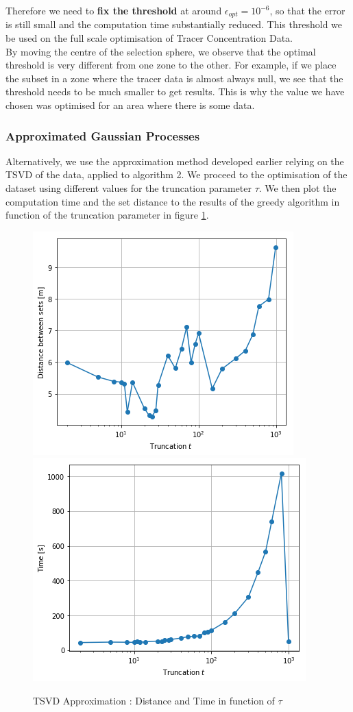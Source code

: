 Therefore we need to \textbf{fix the threshold} at around $ \epsilon_{opt} = 10^{-6}$, so that the error is still small and the computation time substantially reduced. This threshold we be used on the full scale optimisation of Tracer Concentration Data.  \\ 


By moving the centre of the selection sphere, we observe that the optimal threshold is very different from one zone to the other. For example, if we place the subset in a zone where the tracer data is almost always null, we see that the threshold needs to be much smaller to get results. This is why the value we have chosen was optimised for an area where there is some data. 


\subsubsection{Approximated Gaussian Processes}

Alternatively, we use the approximation method developed earlier relying on the TSVD of the data, applied to algorithm 2. We proceed to the optimisation of the dataset using different values for the truncation parameter $\tau$. We then plot the computation time and the set distance to the results of the greedy algorithm in function of the truncation parameter in figure \ref{fig:small_set:tsvd}. \\

\begin{figure}[h]
\centering
\includegraphics[height=0.33\linewidth]{figures/CompAlg/tsvd/dist_trunc}
~
\includegraphics[height=0.33\linewidth]{figures/CompAlg/tsvd/time_trunc}
\caption{TSVD Approximation : Distance and Time in function of $\tau$}
\label{fig:small_set:tsvd}
\end{figure}

